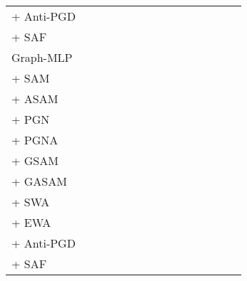 \documentclass[runningheads]{llncs}
\newcommand{\GraphMLP}{Graph-MLP\xspace}
\begin{document}
\begin{table*}[!ht]
\begin{tabular}{l| rrr | rrr | rrr | rr | rr | r}
 + Anti-PGD &  &  &  &  &  &  &  &  &  &  &  &  &  & \\
 + SAF  &  &  &  &  &  &  &  &  &  &  &  &  &  & \\ \hline
\midrule
  \GraphMLP &  &  &  &  &  &  &  &  &  &  &  &  &  & \\ \hline
 + SAM &  &  &  &  &  &  &  &  &  &  &  &  &   & \\
 + ASAM &  &  &  &  &  &  &  &  &  &  &  &  &  & \\
 + PGN &  &  &  &  &  &  &  &  &  &  &  &  &  & \\
 + PGNA &  &  &  &  &  &  &  &  &  &  &  &  &  & \\
 + GSAM &  &  &  &  &  &  &  &  &  &  &  &  &  & \\
 + GASAM &  &  &  &  &  &  &  &  &  &  &  &  &  & \\ \hline
 + SWA &  &  &  &  &  &  &  &  &  &  &  &  &  & \\
 + EWA &  &  &  &  &  &  &  &  &  &  &  &  &  & \\ \hline
 + Anti-PGD &  &  &  &  &  &  &  &  &  &  &  &  &  & \\
 + SAF &  &  &  &  &  &  &  &  &  &  &  &  &  & \\
    \bottomrule
    \end{tabular}
\end{table*}
\end{document}
